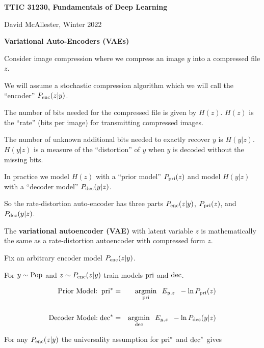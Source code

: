 




{\Huge

  \centerline{\bf TTIC 31230, Fundamentals of Deep Learning}
  \bigskip
  \centerline{David McAllester, Winter 2022}
  \vfill
  \vfill
  \centerline{\bf Variational Auto-Encoders (VAEs)}
  \vfill
  \vfill


Consider image compression where we compress an image $y$ into a compressed file $z$.

\vfill
We will assume a stochastic compression algorithm
which we will call the ``encoder'' $P_{\mathrm{enc}}(z|y)$.

\vfill
The number of bits needed for the compressed file is given by $H(z)$.  $H(z)$
is the ``rate'' (bits per image) for transmitting compressed images.

\vfill
The number of unknown additional bits needed to exactly recover $y$ is $H(y|z)$.
$H(y|z)$ is a measure of the ``distortion'' of $y$ when $y$ is decoded without the missing bits.


In practice we model $H(z)$ with a ``prior model'' $P_{\mathrm{pri}}(z)$ and model $H(y|z)$ with a ``decoder model''
$P_{\mathrm{dec}}(y|z)$.

\vfill
So the rate-distortion auto-encoder has three parts $P_{\mathrm{enc}}(z|y)$, $P_{\mathrm{pri}}(z)$, and $P_{\mathrm{dec}}(y|z)$.

\vfill
The {\bf variational autoencoder (VAE)} with latent variable $z$ is mathematically the same as a rate-distortion autoencoder
with compressed form $z$.



Fix an arbitrary encoder model $P_{\mathrm{enc}}(z|y)$.

\vfill
For $y \sim \mathrm{Pop}$ and $z \sim P_{\mathrm{enc}}(z|y)$ train models $\mathrm{pri}$ and $\mathrm{dec}$.

\begin{eqnarray*}
\mbox{Prior Model:}\;\;\mathrm{pri}^* & = & \operatorname*{argmin}_{\mathrm{pri}} \;\; E_{y,z}\;\;-\ln P_{\mathrm{pri}}(z) \\
\\
\mbox{Decoder Model:}\;\mathrm{dec}^* & = & \operatorname*{argmin}_{\mathrm{dec}}\;\; E_{y,z}\;\;-\ln P_{\mathrm{dec}}(y|z)
\end{eqnarray*}

\vfill
For any $P_{\mathrm{enc}}(z|y)$ the universality assumption for $\mathrm{pri}^*$ and $\mathrm{dec}^*$ gives

}
